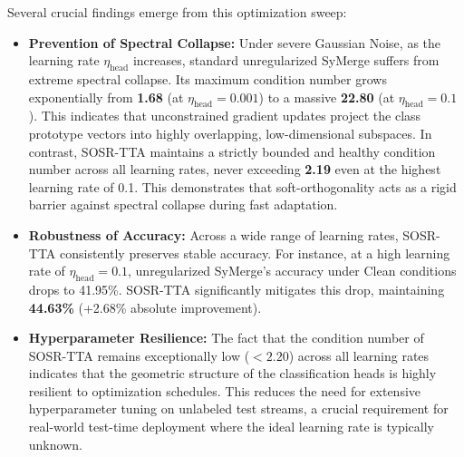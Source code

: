 \documentclass{article}
\theoremstyle{plain}
\theoremstyle{definition}
\theoremstyle{remark}
\begin{document}
Several crucial findings emerge from this optimization sweep:
\begin{itemize}
  \item \textbf{Prevention of Spectral Collapse:} Under severe Gaussian Noise, as the learning rate $\eta_{\text{head}}$ increases, standard unregularized SyMerge suffers from extreme spectral collapse. Its maximum condition number grows exponentially from \textbf{1.68} (at $\eta_{\text{head}} = 0.001$) to a massive \textbf{22.80} (at $\eta_{\text{head}} = 0.1$). This indicates that unconstrained gradient updates project the class prototype vectors into highly overlapping, low-dimensional subspaces. In contrast, SOSR-TTA maintains a strictly bounded and healthy condition number across all learning rates, never exceeding \textbf{2.19} even at the highest learning rate of 0.1. This demonstrates that soft-orthogonality acts as a rigid barrier against spectral collapse during fast adaptation.
  \item \textbf{Robustness of Accuracy:} Across a wide range of learning rates, SOSR-TTA consistently preserves stable accuracy. For instance, at a high learning rate of $\eta_{\text{head}} = 0.1$, unregularized SyMerge's accuracy under Clean conditions drops to 41.95\%. SOSR-TTA significantly mitigates this drop, maintaining \textbf{44.63\%} (+2.68\% absolute improvement). 
  \item \textbf{Hyperparameter Resilience:} The fact that the condition number of SOSR-TTA remains exceptionally low ($< 2.20$) across all learning rates indicates that the geometric structure of the classification heads is highly resilient to optimization schedules. This reduces the need for extensive hyperparameter tuning on unlabeled test streams, a crucial requirement for real-world test-time deployment where the ideal learning rate is typically unknown.
\end{itemize}
\end{document}
